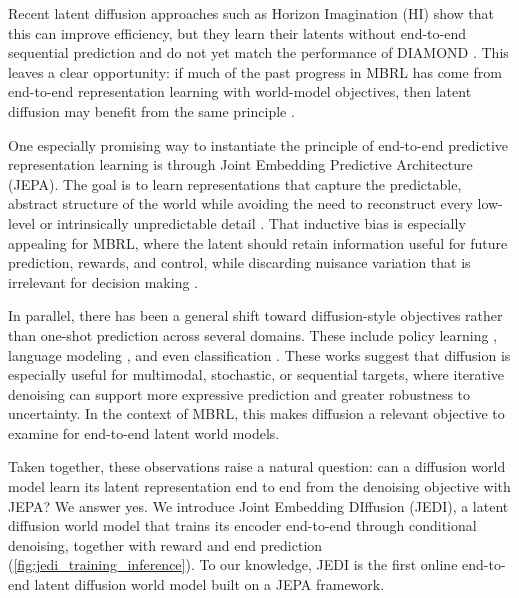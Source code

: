\documentclass{article}
\begin{document}
Recent latent diffusion approaches such as Horizon Imagination (HI) \citep{cohen2026horizonImagination} show that this can improve efficiency, but they learn their latents without end-to-end sequential prediction and do not yet match the performance of DIAMOND \citep{alonso2024diamond}. This leaves a clear opportunity: if much of the past progress in MBRL has come from end-to-end representation learning with world-model objectives, then latent diffusion may benefit from the same principle \citep{hafner2019Planet,Hafner2020Dreamer,hafner2020Dreamerv2,hafner2023Dreamerv3,zhang2023storm,robine2023TWM}. 

One especially promising way to instantiate the principle of end-to-end predictive representation learning is through Joint Embedding Predictive Architecture (JEPA). %
The goal is to learn representations that capture the predictable, abstract structure of the world while avoiding the need to reconstruct every low-level or intrinsically unpredictable detail \citep{PMAX,grill2020BYOL,lecun2022path,assran2023I-JEPA,bardes2024vjepa}. That inductive bias is especially appealing for MBRL, where the latent should retain information useful for future prediction, rewards, and control, while discarding nuisance variation that is irrelevant for decision making \citep{hansen2022TDMPC,hansen2023tdmpc2,assran2025VJEPA2, wang2026temporalstraightening,maes2026leworldmodel}.

In parallel, there has been a general shift toward diffusion-style objectives rather than one-shot prediction across several domains. These include policy learning \citep{chi2023DiffusionPolicy,wang2022DiffPolicyExpressive, frans2025diffusionGuidance}, language modeling \citep{lou2023discreteDiffLMSEDD, prabhudesai2507diffusionBeatLM, li2022diffusion-lm}, and even classification \citep{belhasin2025advancing}. These works suggest that diffusion is especially useful for multimodal, stochastic, or sequential targets, where iterative denoising can support more expressive prediction and greater robustness to uncertainty. In the context of MBRL, this makes diffusion a relevant objective to examine for end-to-end latent world models.

Taken together, these observations raise a natural question: can a diffusion world model learn its latent representation end to end from the denoising objective with JEPA? We answer yes. We introduce Joint Embedding DIffusion (JEDI), a latent diffusion world model that trains its encoder end-to-end through conditional denoising, together with reward and end prediction (\cref{fig:jedi_training_inference}). To our knowledge, JEDI is the first online end-to-end latent diffusion world model built on a JEPA framework.
\end{document}
